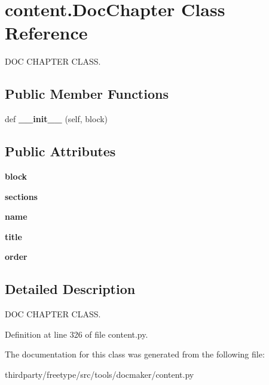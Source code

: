\hypertarget{classcontent_1_1_doc_chapter}{}\section{content.\+Doc\+Chapter Class Reference}
\label{classcontent_1_1_doc_chapter}


D\+OC C\+H\+A\+P\+T\+ER C\+L\+A\+SS.  


\subsection*{Public Member Functions}
\begin{DoxyCompactItemize}
\item 
\mbox{\label{classcontent_1_1_doc_chapter_a874b695ba1a63aec216d9a85fcc4f9f6}} 
def {\bfseries \+\_\+\+\_\+init\+\_\+\+\_\+} (self, block)
\end{DoxyCompactItemize}
\subsection*{Public Attributes}
\begin{DoxyCompactItemize}
\item 
\mbox{\label{classcontent_1_1_doc_chapter_aec9f072b56f76765d8968a0f567a4fb2}} 
{\bfseries block}
\item 
\mbox{\label{classcontent_1_1_doc_chapter_af4ade394cfad27039ca0bb2c844c93c9}} 
{\bfseries sections}
\item 
\mbox{\label{classcontent_1_1_doc_chapter_a5035fa9861bca40d00bb8053b046e310}} 
{\bfseries name}
\item 
\mbox{\label{classcontent_1_1_doc_chapter_a42dcaad0e6839e2d241866f597f6d592}} 
{\bfseries title}
\item 
\mbox{\label{classcontent_1_1_doc_chapter_a450b019aea5567e6528afa3be4476f66}} 
{\bfseries order}
\end{DoxyCompactItemize}


\subsection{Detailed Description}
D\+OC C\+H\+A\+P\+T\+ER C\+L\+A\+SS. 

Definition at line 326 of file content.\+py.



The documentation for this class was generated from the following file\+:\begin{DoxyCompactItemize}
\item 
thirdparty/freetype/src/tools/docmaker/content.\+py\end{DoxyCompactItemize}
